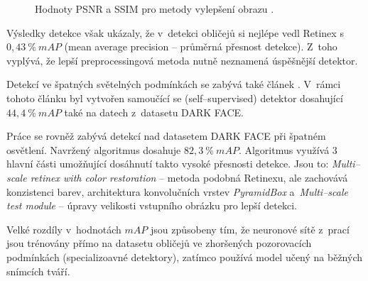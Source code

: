 \begin{figure}[H]
  \begin{center}
  \label{obrazek:psnrssim}
  \caption{Hodnoty PSNR a SSIM pro metody vylepšení obrazu \cite{lowLightFdReview}.}
  \end{center}
\end{figure}

Výsledky detekce však ukázaly, že v~detekci obličejů si nejlépe vedl Retinex s~$0,43\:\%\:mAP$ (mean average precision -- průměrná přesnost detekce). Z~toho vyplývá, že lepší preprocessingová metoda nutně neznamená úspěšnější detektor.

Detekcí ve špatných světelných podmínkách se zabývá také článek \cite{HLAFace}. V~rámci tohoto článku byl vytvořen samoučící se (self--supervised) detektor dosahující $44,4\:\%\:mAP$ také na datech z~datasetu DARK FACE.

Práce \cite{fdExtremelyLowConditions} se rovněž zabývá detekcí nad datasetem DARK FACE při špatném osvětlení. Navržený algoritmus dosahuje $82,3\:\%\:mAP$. Algoritmus využívá 3 hlavní části umožňující dosáhnutí takto vysoké přesnosti detekce. Jsou to: \emph{Multi--scale retinex with color restoration} -- metoda podobná Retinexu, ale zachovává konzistenci barev, architektura konvolučních vrstev \emph{PyramidBox} a~\emph{Multi--scale test module} -- úpravy velikosti vstupního obrázku pro lepší detekci.

Velké rozdíly v~hodnotách $mAP$ jsou způsobeny tím, že neuronové sítě z~prací \cite{HLAFace, fdExtremelyLowConditions} jsou trénovány přímo na datasetu obličejů ve zhoršených pozorovacích podmínkách (specializoavné detektory), zatímco \cite{lowLightFdReview} používá model učený na běžných snímcích tváří.

